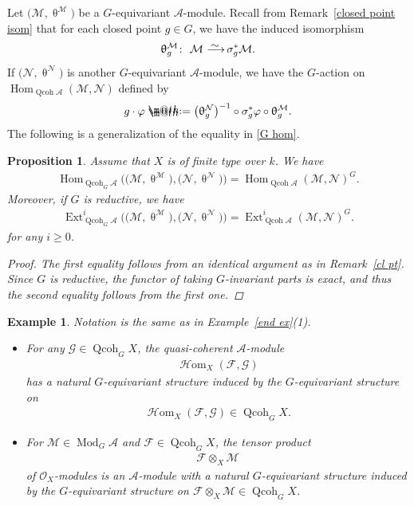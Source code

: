 \documentclass[pdftex]{sigma}%
\makeatletter
\newtheorem{exa}[dfn]{Example}
\newtheorem{prop}[dfn]{Proposition}
\newcommand*{\defeq}{\mathrel{\rlap{%
 \raisebox{0.3ex}{$\m@th\cdot$}}%
 \raisebox{-0.3ex}{$\m@th\cdot$}}%
 =}
\numberwithin{equation}{section}
\newcommand{\Hom}{\operatorname{Hom}}
\newcommand{\cHom}{\operatorname{{\mathcal H}om}}
\newcommand{\Ext}{\operatorname{Ext}}
\newcommand{\Qcoh}{\operatorname{Qcoh}}
\newcommand{\Mod}{\operatorname{Mod}}
\newcommand{\cA}{\mathcal{A}}
\newcommand{\cF}{\mathcal{F}}
\newcommand{\cG}{\mathcal{G}}
\newcommand{\cM}{\mathcal{M}}
\newcommand{\cN}{\mathcal{N}}
\newcommand{\cO}{\mathcal{O}}
\newcommand{\simto}{\,\,\,\,\raisebox{4pt}{$\sim$}{\kern -1.1em \longrightarrow}\,}
\makeatother
\begin{document}
Let $\big(\cM,\uptheta^{\cM}\big)$ be a $G$-equivariant $\cA$-module. Recall from Remark~\ref{closed point isom} that for each closed point $g\in G$, we have the induced isomorphism
\begin{gather*}
\uptheta_g^{\cM}\colon\ \cM\simto \sigma_g^*\cM.
\end{gather*}
If $\big(\cN,\uptheta^{\cN}\big)$ is another $G$-equivariant $\cA$-module, we have the $G$-action on $\Hom_{\Qcoh\cA}(\cM,\cN)$ defined by
\begin{gather*}
g\cdot\varphi\defeq\big(\uptheta^{\cN}_g\big)^{-1}\circ\sigma_g^*\varphi\circ\uptheta^{\cM}_g.
\end{gather*}
The following is a generalization of the equality in \eqref{G hom}.
\begin{prop}\label{G hom 2}
Assume that $X$ is of finite type over $k$. We have
\begin{gather*}
\Hom_{\Qcoh_G\cA}\big(\big(\cM,\uptheta^{\cM}\big),\big(\cN,\uptheta^{\cN}\big)\big) =\Hom_{\Qcoh\cA}(\cM,\cN)^G.
\end{gather*}
Moreover, if $G$ is reductive, we have
\begin{gather*}
\Ext_{\Qcoh_G\cA}^i\big(\big(\cM,\uptheta^{\cM}\big),\big(\cN,\uptheta^{\cN}\big)\big) =\Ext_{\Qcoh\cA}^i(\cM,\cN)^G.
\end{gather*}
for any $i\geq0$.
\begin{proof}
The first equality follows from an identical argument as in Remark~\ref{cl pt}. Since $G$ is reductive, the functor
of taking $G$-invariant parts is exact, and thus the second equality follows from the first one.
\end{proof}
\end{prop}

\begin{exa} %
Notation is the same as in Example~\ref{end ex}(1).

\begin{itemize}\itemsep=0pt
\item[$1.$] For any $\cG\in \Qcoh_GX$, the quasi-coherent $\cA$-module \begin{gather*}\cHom_X(\cF,\cG)\end{gather*} has a natural $G$-equivariant structure induced by the $G$-equivariant structure on
 \begin{gather*}
 \cHom_X(\cF,\cG)\in \Qcoh_GX.
 \end{gather*}


\item[$2.$] For $\cM\in \Mod_G\cA$ and $\cF\in \Qcoh_GX$, the tensor product \begin{gather*}\cF\otimes_X \cM\end{gather*} of $\cO_X$-modules is an $\cA$-module with a natural $G$-equivariant structure induced by the $G$-equivariant structure on $\cF\otimes_X \cM\in \Qcoh_GX$.
\end{itemize}
\end{exa}
\end{document}
